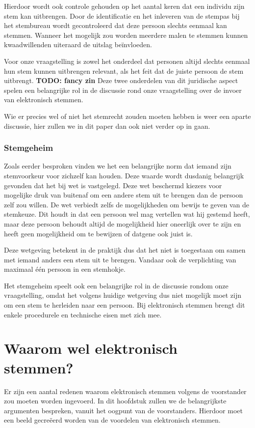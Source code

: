\documentclass[a4paper]{article}
\newcommand{\TODO}[1]{{\color{red}\textbf{TODO: #1}}}
\begin{document}
Hierdoor wordt ook controle gehouden op het aantal keren dat een individu zijn stem kan uitbrengen.
Door de identificatie en het inleveren van de stempas bij het stembureau wordt gecontroleerd dat deze persoon slechts eenmaal kan stemmen.
Wanneer het mogelijk zou worden meerdere malen te stemmen kunnen kwaadwillenden uiteraard de uitslag beïnvloeden.

Voor onze vraagstelling is zowel het onderdeel dat personen altijd slechts eenmaal hun stem kunnen uitbrengen relevant, als het feit dat de juiste persoon de stem uitbrengt. \TODO{fancy zin}
Deze twee onderdelen van dit juridische aspect spelen een belangrijke rol in de discussie rond onze vraagstelling over de invoer van elektronisch stemmen.

Wie er precies wel of niet het stemrecht zouden moeten hebben is weer een aparte discussie, hier zullen we in dit paper dan ook niet verder op in gaan.

\subsubsection{Stemgeheim}
Zoals eerder besproken vinden we het een belangrijke norm dat iemand zijn stemvoorkeur voor zichzelf kan houden.
Deze waarde wordt dusdanig belangrijk gevonden dat het bij wet is vastgelegd.
Deze wet beschermd kiezers voor mogelijke druk van buitenaf om een andere stem uit te brengen dan de persoon zelf zou willen.
De wet verbiedt zelfs de mogelijkheden om bewijs te geven van de stemkeuze.
Dit houdt in dat een persoon wel mag vertellen wat hij gestemd heeft, maar deze persoon behoudt altijd de mogelijkheid hier oneerlijk over te zijn en heeft geen mogelijkheid om te bewijzen of datgene ook juist is.

Deze wetgeving betekent in de praktijk dus dat het niet is toegestaan om samen met iemand anders een stem uit te brengen.
Vandaar ook de verplichting van maximaal {\'e}{\'e}n persoon in een stemhokje.

Het stemgeheim speelt ook een belangrijke rol in de discussie rondom onze vraagstelling, omdat het volgens huidige wetgeving dus niet mogelijk moet zijn om een stem te herleiden naar een persoon.
Bij elektronisch stemmen brengt dit enkele procedurele en technische eisen met zich mee.

\newpage

\section{Waarom wel elektronisch stemmen?}
Er zijn een aantal redenen waarom elektronisch stemmen volgens de voorstander zou moeten worden ingevoerd.
In dit hoofdstuk zullen we de belangrijkste argumenten bespreken, vanuit het oogpunt van de voorstanders.
Hierdoor moet een beeld gecre{\"e}erd worden van de voordelen van elektronisch stemmen.
\end{document}
